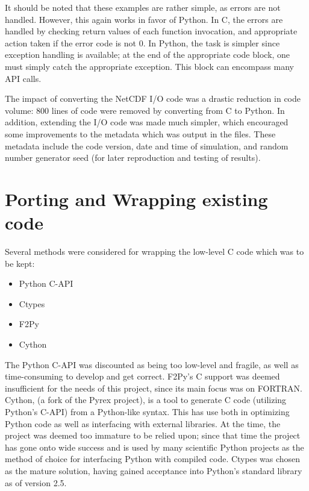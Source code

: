\documentclass[twocolumn]{article}
\begin{document}
It should be noted that these examples are rather simple, as errors are not
handled. However, this again works in favor of Python. In C, the errors are
handled by checking return values of each function invocation, and appropriate
action taken if the error code is not 0. In Python, the task is simpler
since exception handling is available; at the end of the appropriate code block, 
one must simply catch the appropriate exception. This block can encompass
many API calls.

The impact of converting the NetCDF I/O code was a drastic reduction in code
volume: 800 lines of code were removed by converting from C to Python. In
addition, extending the I/O code was made much simpler, which encouraged
some improvements to the metadata which was output in the files. These metadata
include the code version, date and time of simulation, and random number generator
seed (for later reproduction and testing of results).

\section{Porting and Wrapping existing code}
Several methods were considered for wrapping the low-level C code which was to
be kept:
\begin{itemize}
    \item Python C-API
    \item Ctypes
    \item F2Py
    \item Cython
\end{itemize}
The Python C-API was discounted as being too low-level and fragile, as well
as time-consuming to develop and get correct. F2Py's C support was deemed
insufficient for the needs of this project, since its main focus was on FORTRAN.
Cython, (a fork of the Pyrex project), is a tool to generate C code (utilizing
Python's C-API) from a Python-like syntax. This has use both in optimizing
Python code as well as interfacing with external libraries. At the time, the
project was deemed too immature to be relied upon; since that time the project
has gone onto wide success and is used by many scientific Python projects as the
method of choice for interfacing Python with compiled code. Ctypes was chosen as
the mature solution, having gained acceptance into Python's standard library as
of version 2.5. \cite{ctypes}
\end{document}
